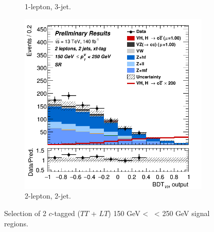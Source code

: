 \begin{figure}[h!]
\begin{subfigure}[b]{0.32\textwidth}
      \caption{1-lepton, 3-jet.}
      \label{fig:plots_VHcc_ex_1L_SR_2C}
  \end{subfigure}
  \begin{subfigure}[b]{0.32\textwidth}
    \centering
    \includegraphics[width=\textwidth]{Images/VH/Own_fit/prefit_VHcc/Region_distmva_BMax250_BMin150_DSR_J2_TTypext_T2_L2_Y6051_Prefit.png}
    \caption{2-lepton, 2-jet.}
    \label{fig:plots_VHcc_ex_2L_SR_2C}
\end{subfigure}
  \caption{Selection of 2 $c$-tagged ($TT$ + $LT$) 150 GeV < \ptv\ < 250 GeV signal regions.}
  \label{fig:plots_VHcc_ex_SR_2C}
\end{figure} 


